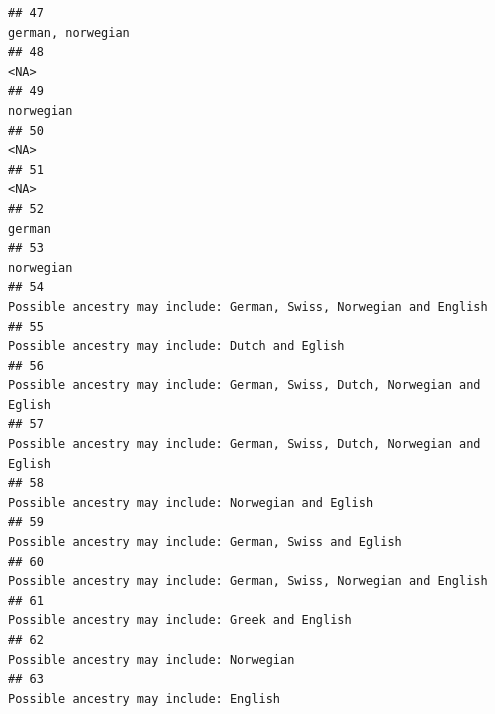 \documentclass[]{article}
\begin{document}
\begin{verbatim}
## 47                                                                                                                                    german, norwegian
## 48                                                                                                                                                 <NA>
## 49                                                                                                                                            norwegian
## 50                                                                                                                                                 <NA>
## 51                                                                                                                                                 <NA>
## 52                                                                                                                                               german
## 53                                                                                                                                            norwegian
## 54                                                                                  Possible ancestry may include: German, Swiss, Norwegian and English
## 55                                                                                                      Possible ancestry may include: Dutch and Eglish
## 56                                                                            Possible ancestry may include: German, Swiss, Dutch, Norwegian and Eglish
## 57                                                                            Possible ancestry may include: German, Swiss, Dutch, Norwegian and Eglish
## 58                                                                                                  Possible ancestry may include: Norwegian and Eglish
## 59                                                                                              Possible ancestry may include: German, Swiss and Eglish
## 60                                                                                  Possible ancestry may include: German, Swiss, Norwegian and English
## 61                                                                                                     Possible ancestry may include: Greek and English
## 62                                                                                                             Possible ancestry may include: Norwegian
## 63                                                                                                               Possible ancestry may include: English

\end{verbatim}
\end{document}
